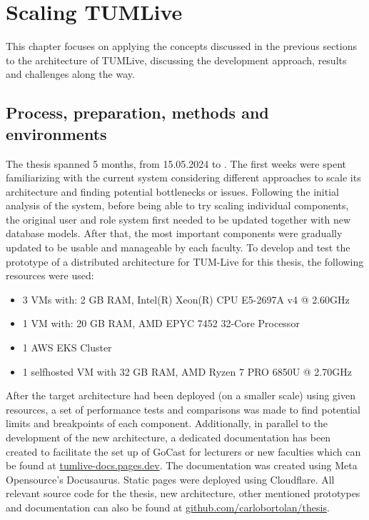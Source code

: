 
\chapter{Scaling TUMLive}\label{chapter:introduction}

This chapter focuses on applying the concepts discussed in the previous sections to the architecture of TUMLive, discussing the development approach, results and challenges along the way. 

\section{Process, preparation, methods and environments}

The thesis spanned 5 months, from 15.05.2024 to \getSubmissionDate{}. The first weeks were spent familiarizing with the current system considering different approaches to scale its architecture and finding potential bottlenecks or issues. Following the initial analysis of the system, before being able to try scaling individual components, the original user and role system first needed to be updated together with new database models. After that, the most important components were gradually updated to be usable and manageable by each faculty. 
To develop and test the prototype of a distributed architecture for TUM-Live for this thesis, the following resources were used:
\begin{itemize}
    \item 3 \ac{VM}s with: 2 GB RAM, Intel(R) Xeon(R) CPU E5-2697A v4 @ 2.60GHz
    \item 1 \ac{VM} with: 20 GB RAM, AMD EPYC 7452 32-Core Processor
    \item 1 \ac{AWS} \ac{EKS} Cluster
    \item 1 selfhosted \ac{VM} with 32 GB RAM, AMD Ryzen 7 PRO 6850U @ 2.70GHz
\end{itemize}

After the target architecture had been deployed (on a smaller scale) using given resources, a set of performance tests and comparisons was made to find potential limits and breakpoints of each component. 
Additionally, in parallel to the development of the new architecture, a dedicated documentation has been created to facilitate the set up of GoCast for lecturers or new faculties which can be found at \href{https://tumlive-docs.pages.dev/}{tumlive-docs.pages.dev}. The documentation was created using Meta Opensource's Docusaurus. Static pages were deployed using Cloudflare.
All relevant source code for the thesis, new architecture, other mentioned prototypes and documentation can also be found at \href{https://github.com/carlobortolan/thesis}{github.com/carlobortolan/thesis}.

